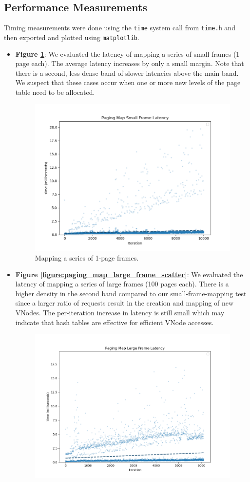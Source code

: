 \subsection{Performance Measurements}
Timing measurements were done using the \texttt{time} system call from \texttt{time.h} and then exported and plotted using \texttt{matplotlib}.
\begin{itemize}[itemsep=0pt]
    \item \textbf{Figure \ref{figure:paging_map_small_frame_scatter}}: We evaluated the latency of mapping a series of small frames (1 page each). The average latency increases by only a small margin. Note that there is a second, less dense band of slower latencies above the main band. We suspect that these cases occur when one or more new levels of the page table need to be allocated.
    \begin{figure}[ht]
        \centering
        \includegraphics[width=0.58\columnwidth]{images/paging_map_small_frame_scatter.png}
        \caption{Mapping a series of 1-page frames.}
        \label{figure:paging_map_small_frame_scatter}
    \end{figure}
    \item \textbf{Figure \ref{figure:paging_map_large_frame_scatter}}: We evaluated the latency of mapping a series of large frames (100 pages each). There is a higher density in the second band compared to our small-frame-mapping test since a larger ratio of requests result in the creation and mapping of new VNodes. The per-iteration increase in latency is still small which may indicate that hash tables are effective for efficient VNode accesses.
    \begin{figure}[ht]
        \centering
        \includegraphics[width=0.58\columnwidth]{images/paging_map_large_frame_scatter.png}

\end{figure}
\end{itemize}
